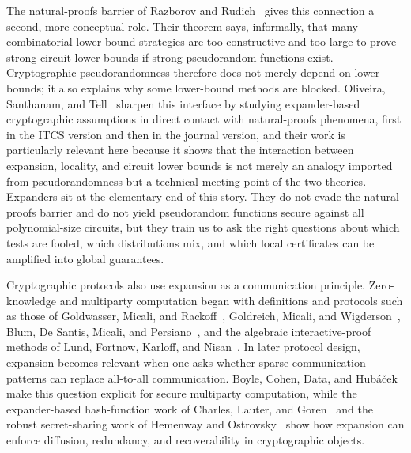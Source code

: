 The natural-proofs barrier of Razborov and Rudich~\cite{RR1997} gives this connection a second, more conceptual role. Their theorem says, informally, that many combinatorial lower-bound strategies are too constructive and too large to prove strong circuit lower bounds if strong pseudorandom functions exist. Cryptographic pseudorandomness therefore does not merely depend on lower bounds; it also explains why some lower-bound methods are blocked. Oliveira, Santhanam, and Tell~\cite{ITCS:OliSanTel19,OST2022} sharpen this interface by studying expander-based cryptographic assumptions in direct contact with natural-proofs phenomena, first in the ITCS version and then in the journal version, and their work is particularly relevant here because it shows that the interaction between expansion, locality, and circuit lower bounds is not merely an analogy imported from pseudorandomness but a technical meeting point of the two theories. Expanders sit at the elementary end of this story. They do not evade the natural-proofs barrier and do not yield pseudorandom functions secure against all polynomial-size circuits, but they train us to ask the right questions about which tests are fooled, which distributions mix, and which local certificates can be amplified into global guarantees.

Cryptographic protocols also use expansion as a communication principle. Zero-knowledge and multiparty computation began with definitions and protocols such as those of Goldwasser, Micali, and Rackoff~\cite{GolMicRac89}, Goldreich, Micali, and Wigderson~\cite{GolMicWig91}, Blum, De Santis, Micali, and Persiano~\cite{BDSMP1991}, and the algebraic interactive-proof methods of Lund, Fortnow, Karloff, and Nisan~\cite{JACM:LFKN92}. In later protocol design, expansion becomes relevant when one asks whether sparse communication patterns can replace all-to-all communication. Boyle, Cohen, Data, and Hub{\'a}{\v{c}}ek~\cite{C:BCDH18} make this question explicit for secure multiparty computation, while the expander-based hash-function work of Charles, Lauter, and Goren~\cite{JC:ChaLauGor09} and the robust secret-sharing work of Hemenway and Ostrovsky~\cite{EPRINT:HemOst16} show how expansion can enforce diffusion, redundancy, and recoverability in cryptographic objects.

